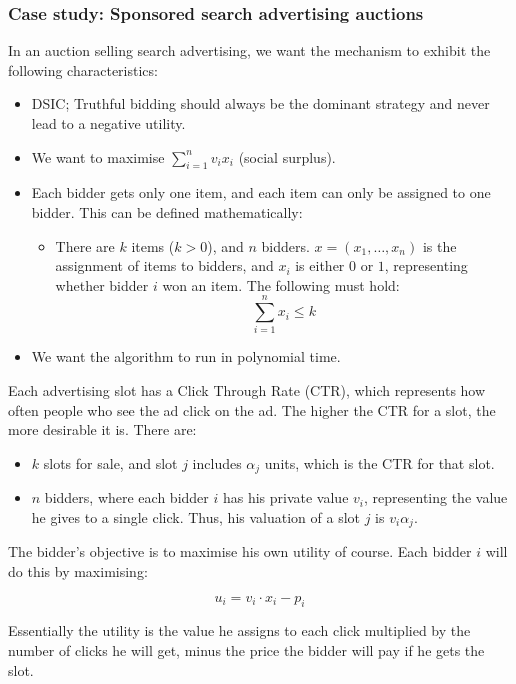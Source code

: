 \subsubsection{Case study: Sponsored search advertising auctions}

In an auction selling search advertising, we want the mechanism to exhibit the
following characteristics:

\begin{itemize}
  \item DSIC; Truthful bidding should always be the dominant strategy and never
  lead to a negative utility.
  \item We want to maximise $\sum^n_{i=1}v_ix_i$ (social surplus).
  \item Each bidder gets only one item, and each item can only be assigned to 
  one bidder. This can be defined mathematically:
  \begin{itemize}
    \item[] There are $k$ items ($k>0$), and $n$ bidders.
    $x = (x_1, \dots, x_n)$ is the assignment of items to bidders, and $x_i$ is
    either $0$ or $1$, representing whether bidder $i$ won an item. The 
    following must hold:
    \[
      \sum\limits^n_{i=1}x_i \leq k
    \]
  \end{itemize}
  \item We want the algorithm to run in polynomial time.
\end{itemize}

Each advertising slot has a Click Through Rate (CTR), which represents how often
people who see the ad click on the ad. The higher the CTR for a slot, the more
desirable it is. There are:

\begin{itemize}
  \item $k$ slots for sale, and slot $j$ includes $\alpha_j$ units, which is the
  CTR for that slot.
  \item $n$ bidders, where each bidder $i$ has his private value $v_i$, 
  representing the value he gives to a single click. Thus, his valuation of a
  slot $j$ is $v_i\alpha_j$.
\end{itemize}

The bidder's objective is to maximise his own utility of course. Each bidder $i$
will do this by maximising:

\[
  u_i = v_i \cdot x_i - p_i
\]

Essentially the utility is the value he assigns to each click multiplied by the
number of clicks he will get, minus the price the bidder will pay if he gets the
slot.

